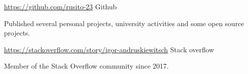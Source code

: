 \documentclass[10pt, a4paper]{resume}
\begin{document}
\begin{cventries}

  \cventry
    {\href{https://github.com/rusito-23}{https://github.com/rusito-23}}
    {Github}
    {}
    {}
    {
      \begin{cvitems}
      \item {Published several personal projects, university activities and some open source projects.}
      \end{cvitems}
    }

  \cventry
    {\href{https://stackoverflow.com/story/igor-andruskiewitsch}{https://stackoverflow.com/story/igor-andruskiewitsch}}
    {Stack overflow}
    {}
    {}
    {
      \begin{cvitems}
        \item {Member of the Stack Overflow community since 2017.}
      \end{cvitems}
    }

\end{cventries}


\end{document}
